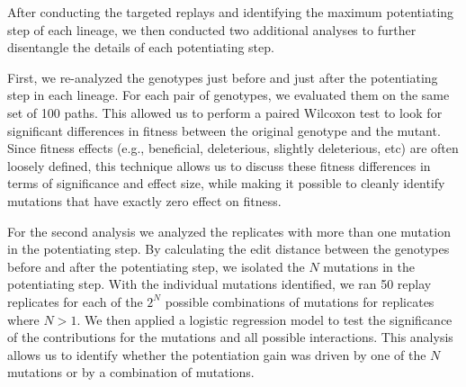 After conducting the targeted replays and identifying the maximum potentiating step  of each lineage, we then conducted two additional analyses to further disentangle the details of each potentiating step. 

First, we re-analyzed the genotypes just before and just after the potentiating step in each lineage.
For each pair of genotypes, we evaluated them on the same set of 100 paths. 
This allowed us to perform a paired Wilcoxon test to look for significant differences in fitness between the original genotype and the mutant.
Since fitness effects (e.g., beneficial, deleterious, slightly deleterious, etc) are often loosely defined, this technique allows us to discuss these fitness differences in terms of significance and effect size, while making it possible to cleanly identify mutations that have exactly zero effect on fitness.

For the second analysis we analyzed the replicates with more than one mutation in the potentiating step. 
By calculating the edit distance \citep{wagnerStringtoStringCorrectionProblem1974} between the genotypes before and after the potentiating step, we isolated the $N$ mutations in the potentiating step. 
With the individual mutations identified, we ran 50 replay replicates for each of the $2^N$ possible combinations of mutations for replicates where $N>1$. 
We then applied a logistic regression model to test the significance of the contributions for the mutations and all possible interactions.
This analysis allows us to identify whether the potentiation gain was driven by one of the $N$ mutations or by a combination of mutations. 